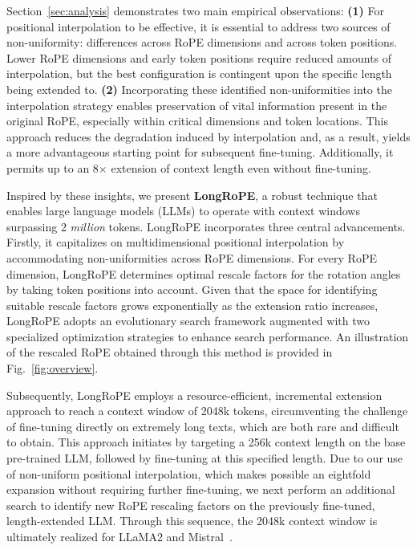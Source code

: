Section~\ref{sec:analysis} demonstrates two main empirical observations: \textbf{(1)} For positional interpolation to be effective, it is essential to address two sources of non-uniformity: differences across RoPE dimensions and across token positions. Lower RoPE dimensions and early token positions require reduced amounts of interpolation, but the best configuration is contingent upon the specific length being extended to. \textbf{(2)} Incorporating these identified non-uniformities into the interpolation strategy enables preservation of vital information present in the original RoPE, especially within critical dimensions and token locations. This approach reduces the degradation induced by interpolation and, as a result, yields a more advantageous starting point for subsequent fine-tuning. Additionally, it permits up to an 8$\times$ extension of context length even without fine-tuning.

Inspired by these insights, we present \textbf{LongRoPE}, a robust technique that enables large language models (LLMs) to operate with context windows surpassing 2 \emph{million} tokens. LongRoPE incorporates three central advancements. Firstly, it capitalizes on multidimensional positional interpolation by accommodating non-uniformities across RoPE dimensions. For every RoPE dimension, LongRoPE determines optimal rescale factors for the rotation angles by taking token positions into account. Given that the space for identifying suitable rescale factors grows exponentially as the extension ratio increases, LongRoPE adopts an evolutionary search framework augmented with two specialized optimization strategies to enhance search performance. An illustration of the rescaled RoPE obtained through this method is provided in Fig.~\ref{fig:overview}.

Subsequently, {LongRoPE} employs a resource-efficient, incremental extension approach to reach a context window of 2048k tokens, circumventing the challenge of fine-tuning directly on extremely long texts, which are both rare and difficult to obtain. This approach initiates by targeting a 256k context length on the base pre-trained LLM, followed by fine-tuning at this specified length. Due to our use of non-uniform positional interpolation, which makes possible an eightfold expansion without requiring further fine-tuning, we next perform an additional search to identify new RoPE rescaling factors on the previously fine-tuned, length-extended LLM. Through this sequence, the 2048k context window is ultimately realized for LLaMA2 and Mistral~\cite{mistral}.

